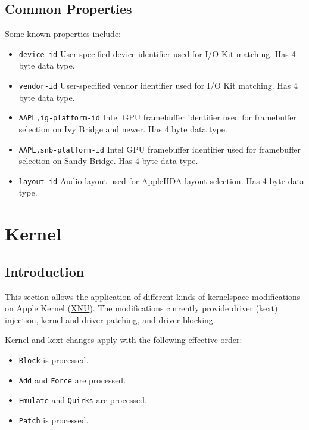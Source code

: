 \documentclass[]{article}
\providecommand{\tightlist}{%
  \setlength{\itemsep}{0pt}\setlength{\parskip}{0pt}}
\begin{document}
\subsection{Common Properties}\label{devpropscommon}

Some known properties include:

\begin{itemize}
\tightlist
\item
  \texttt{device-id}
  \break
  User-specified device identifier used for I/O Kit matching. Has 4 byte data type.
\item
  \texttt{vendor-id}
  \break
  User-specified vendor identifier used for I/O Kit matching. Has 4 byte data type.
\item
  \texttt{AAPL,ig-platform-id}
  \break
  Intel GPU framebuffer identifier used for framebuffer selection on Ivy Bridge and newer.
  Has 4 byte data type.
\item
  \texttt{AAPL,snb-platform-id}
  \break
  Intel GPU framebuffer identifier used for framebuffer selection on Sandy Bridge.
  Has 4 byte data type.
\item
  \texttt{layout-id}
  \break
  Audio layout used for AppleHDA layout selection. Has 4 byte data type.
\end{itemize}


\section{Kernel}\label{kernel}

\subsection{Introduction}\label{kernelintro}

This section allows the application of different kinds of kernelspace modifications on
Apple Kernel (\href{https://opensource.apple.com/source/xnu}{XNU}). The modifications
currently provide driver (kext) injection, kernel and driver patching, and driver
blocking.

Kernel and kext changes apply with the following effective order:

\begin{itemize}
\tightlist
\item \texttt{Block} is processed.
\item \texttt{Add} and \texttt{Force} are processed.
\item \texttt{Emulate} and \texttt{Quirks} are processed.
\item \texttt{Patch} is processed.
\end{itemize}
\end{document}
